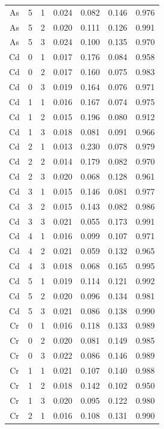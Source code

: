 \documentclass[ms, hidelinks]{uncgdissertationexp}
\theoremstyle{plain}
\theoremstyle{definition}
\theoremstyle{remark}
\begin{document}
\begin{longtable}{ccccccc}
As & 5 & 1 & 0.024 & 0.082 & 0.146 & 0.976\\
\rowcolor{gray!6}  As & 5 & 2 & 0.020 & 0.111 & 0.126 & 0.991\\
As & 5 & 3 & 0.024 & 0.100 & 0.135 & 0.970\\
\rowcolor{gray!6}  Cd & 0 & 1 & 0.017 & 0.176 & 0.084 & 0.958\\
Cd & 0 & 2 & 0.017 & 0.160 & 0.075 & 0.983\\
\rowcolor{gray!6}  Cd & 0 & 3 & 0.019 & 0.164 & 0.076 & 0.971\\
Cd & 1 & 1 & 0.016 & 0.167 & 0.074 & 0.975\\
\rowcolor{gray!6}  Cd & 1 & 2 & 0.015 & 0.196 & 0.080 & 0.912\\
Cd & 1 & 3 & 0.018 & 0.081 & 0.091 & 0.966\\
\rowcolor{gray!6}  Cd & 2 & 1 & 0.013 & 0.230 & 0.078 & 0.979\\
Cd & 2 & 2 & 0.014 & 0.179 & 0.082 & 0.970\\
\rowcolor{gray!6}  Cd & 2 & 3 & 0.020 & 0.068 & 0.128 & 0.961\\
Cd & 3 & 1 & 0.015 & 0.146 & 0.081 & 0.977\\
\rowcolor{gray!6}  Cd & 3 & 2 & 0.015 & 0.143 & 0.082 & 0.986\\
Cd & 3 & 3 & 0.021 & 0.055 & 0.173 & 0.991\\
\rowcolor{gray!6}  Cd & 4 & 1 & 0.016 & 0.099 & 0.107 & 0.971\\
Cd & 4 & 2 & 0.021 & 0.059 & 0.132 & 0.965\\
\rowcolor{gray!6}  Cd & 4 & 3 & 0.018 & 0.068 & 0.165 & 0.995\\
Cd & 5 & 1 & 0.019 & 0.114 & 0.121 & 0.992\\
\rowcolor{gray!6}  Cd & 5 & 2 & 0.020 & 0.096 & 0.134 & 0.981\\
Cd & 5 & 3 & 0.021 & 0.086 & 0.138 & 0.990\\
\rowcolor{gray!6}  Cr & 0 & 1 & 0.016 & 0.118 & 0.133 & 0.989\\
Cr & 0 & 2 & 0.020 & 0.081 & 0.149 & 0.985\\
\rowcolor{gray!6}  Cr & 0 & 3 & 0.022 & 0.086 & 0.146 & 0.989\\
Cr & 1 & 1 & 0.021 & 0.107 & 0.140 & 0.988\\
\rowcolor{gray!6}  Cr & 1 & 2 & 0.018 & 0.142 & 0.102 & 0.950\\
Cr & 1 & 3 & 0.020 & 0.095 & 0.122 & 0.980\\
\rowcolor{gray!6}  Cr & 2 & 1 & 0.016 & 0.108 & 0.131 & 0.990\\

\end{longtable}
\end{document}
